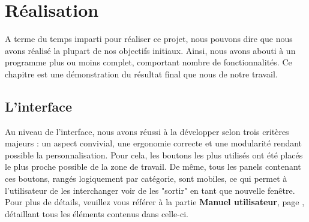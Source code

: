 \documentclass[a4paper]{memoir}
\begin{document}
	\chapter{Réalisation}
		A terme du temps imparti pour réaliser ce projet, nous pouvons dire que nous avons réalisé la plupart de nos objectifs initiaux. Ainsi, nous avons 
		abouti à un programme plus ou moins complet, comportant nombre de fonctionnalités. Ce chapitre est une démonstration du résultat final que nous de 
		notre travail.
		
		\section{L'interface}
			Au niveau de l'interface, nous avons réussi à la développer selon trois critères majeurs : un aspect convivial, une ergonomie correcte et une 
			modularité rendant possible la personnalisation. Pour cela, les boutons les plus utilisés ont été placés le plus proche possible de la zone de 
			travail. De même, tous les panels contenant ces boutons, rangés logiquement par catégorie, sont mobiles, ce qui permet à l'utilisateur de les 
			interchanger voir de les "sortir" en tant que nouvelle fenêtre. Pour plus de détails, veuillez vous référer à la partie 
			\textbf{Manuel utilisateur}, page \pageref{man-user}, détaillant tous les éléments contenus dans celle-ci.
			
\end{document}
